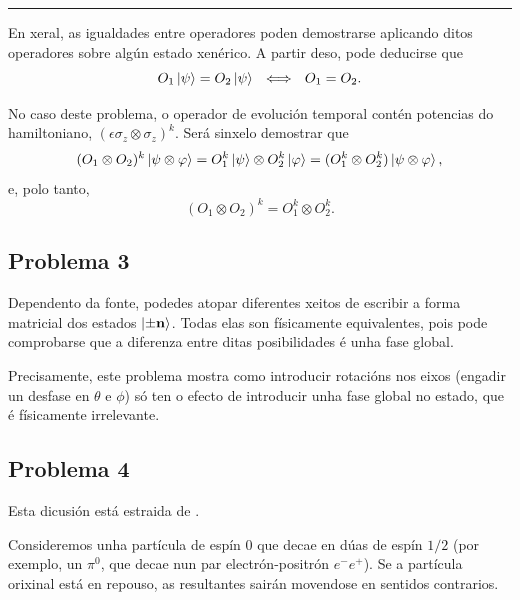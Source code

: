 \documentclass[a4paper,12pt]{article}
\begin{document}
\begin{center} \hrule \end{center}

En xeral, as igualdades entre operadores poden demostrarse aplicando ditos operadores sobre algún estado xenérico. A partir deso, pode deducirse que
\begin{equation}
	O_1\ket{\psi} = O_2\ket{\psi} ~~ \Longleftrightarrow~~ O_1 = O_2.
\end{equation}

No caso deste problema, o operador de evolución temporal contén potencias do hamiltoniano, $(\epsilon \sigma_z \otimes \sigma_z)^k$. Será sinxelo demostrar que
\begin{equation}
	(O_1 \otimes O_2)^k \ket{\psi \otimes \varphi} = O_1^k \ket{\psi} \otimes O_2^k \ket{\varphi} = (O_1^k \otimes O_2^k) \ket{\psi \otimes \varphi},
\end{equation}
\noindent
e, polo tanto,
\begin{equation}
	(O_1 \otimes O_2)^k = O_1^k \otimes O_2^k.
\end{equation}

\subsection*{Problema 3}

Dependento da fonte, podedes atopar diferentes xeitos de escribir a forma matricial dos estados $\ket{\pm \textbf{n}}$. Todas elas son físicamente equivalentes, pois pode comprobarse que a diferenza entre ditas posibilidades é unha fase global.

Precisamente, este problema mostra como introducir rotacións nos eixos (engadir un desfase en $\theta$ e $\phi$) só ten o efecto de introducir unha fase global no estado, que é físicamente irrelevante.

\subsection*{Problema 4}

Esta dicusión está estraida de \cite{le_Bellac}.

Consideremos unha partícula de espín 0 que decae en dúas de espín $1/2$ (por exemplo, un $\pi^0$, que decae nun par electrón-positrón $e^- e^+$). Se a partícula orixinal está en repouso, as resultantes sairán movendose en sentidos contrarios. 
\end{document}

